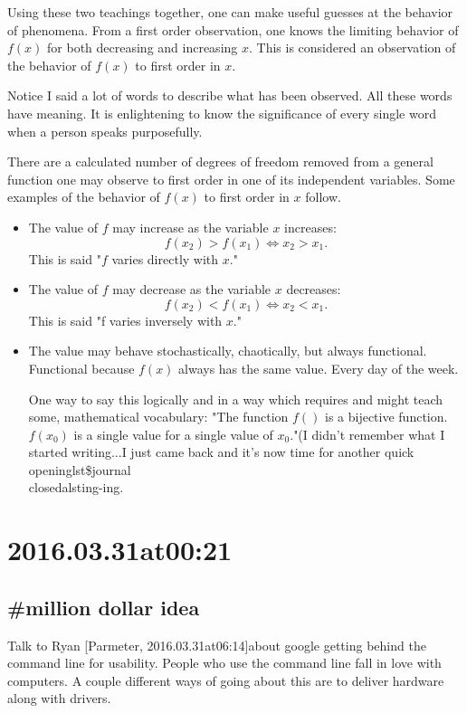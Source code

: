 Using these two teachings together, one can make useful guesses at the behavior of phenomena. From a first order observation, one knows the limiting behavior of $f(x)$ for both decreasing and increasing $x$. This is considered an observation of the behavior of $f(x)$ to first order in $x$.

Notice I said a lot of words to describe what has been observed. All these words have meaning. It is enlightening to know the significance of every single word when a person speaks purposefully.

There are a calculated number of degrees of freedom removed from a general function one may observe to first order in one of its independent variables. Some examples of the behavior of $f(x)$ to first order in $x$ follow.

\begin{itemize}
  \item The value of $f$ may increase as the variable $x$ increases:$$f(x_2) > f(x_1) \Leftrightarrow x_2 > x_1.$$ This is said "$f$ varies directly with $x$."
   \item The value of $f$ may decrease as the variable $x$ decreases:$$f(x_2) < f(x_1) \Leftrightarrow x_2 < x_1.$$ This is said "f varies inversely with $x$."
   \item The value may behave stochastically, chaotically, but always functional. Functional because $f(x)$ always has the same value. Every day of the week.

One way to say this logically and in a way which requires and might teach some, mathematical vocabulary:
"The function $f()$ is a bijective function. $f(x_0)$ is a single value for a single value of $x_0$."(I didn't remember what I started writing...I just came back and it's now time for another quick \\openinglst\$journal\\closedalsting-ing.
\end{itemize}

\section*{ 2016.03.31at00:21 }
\subsection*{\#{million dollar idea}}
Talk to Ryan [Parmeter, 2016.03.31at06:14]about google getting behind the command line for usability. People who use the command line fall in love with computers. A couple different ways of going about this are to deliver hardware along with drivers.


